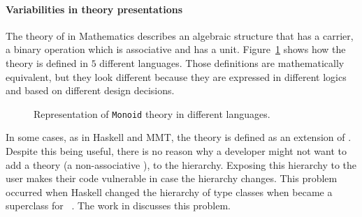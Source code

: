 

\paragraph{Variabilities in theory presentations}
The theory of  in Mathematics describes an algebraic structure that has a carrier, a binary operation which is associative and has a unit. 
Figure~\ref{fig:mon-diff-lang} shows how the  theory is defined in $5$ different languages. Those definitions are mathematically equivalent, but they look different because they are expressed in different logics and based on different design decisions. 
\begin{figure}
    
    \caption{Representation of \lstinline|Monoid| theory in different languages.}
    \label{fig:mon-diff-lang}
\end{figure}

In some cases, as in Haskell and MMT, the theory \monoid is defined as an extension of \semigroup. Despite this being useful, there is no reason why a developer might not want to add a theory \unital (a non-associative \monoid), to the hierarchy. Exposing this hierarchy to the user makes their code vulnerable in case the hierarchy changes. This problem occurred when Haskell changed the hierarchy of type classes when  became a superclass for  ~\cite{wiki:haskell_hierarch}. The work in \cite{cohen2020hierarchy} discusses this problem. 

